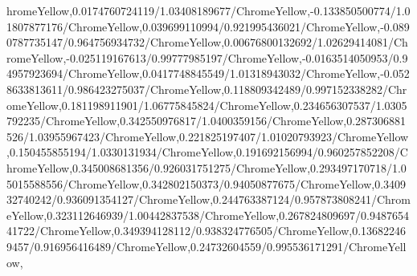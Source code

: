 {\begin{tikzternal}
{hromeYellow,0.0174760724119/1.03408189677/ChromeYellow,-0.133850500774/1.01807877176/ChromeYellow,0.039699110994/0.921995436021/ChromeYellow,-0.0890787735147/0.964756934732/ChromeYellow,0.00676800132692/1.02629414081/ChromeYellow,-0.025119167613/0.99777985197/ChromeYellow,-0.0163514050953/0.94957923694/ChromeYellow,0.0417748845549/1.01318943032/ChromeYellow,-0.0528633813611/0.986423275037/ChromeYellow,0.118809342489/0.997152338282/ChromeYellow,0.181198911901/1.06775845824/ChromeYellow,0.234656307537/1.0305792235/ChromeYellow,0.342550976817/1.0400359156/ChromeYellow,0.287306881526/1.03955967423/ChromeYellow,0.221825197407/1.01020793923/ChromeYellow,0.150455855194/1.0330131934/ChromeYellow,0.191692156994/0.960257852208/ChromeYellow,0.345008681356/0.926031751275/ChromeYellow,0.293497170718/1.05015588556/ChromeYellow,0.342802150373/0.94050877675/ChromeYellow,0.340932740242/0.936091354127/ChromeYellow,0.244763387124/0.957873808241/ChromeYellow,0.323112646939/1.00442837538/ChromeYellow,0.267824809697/0.948765441722/ChromeYellow,0.349394128112/0.938324776505/ChromeYellow,0.136822469457/0.916956416489/ChromeYellow,0.24732604559/0.995536171291/ChromeYellow,
}
\end{tikzternal}}

